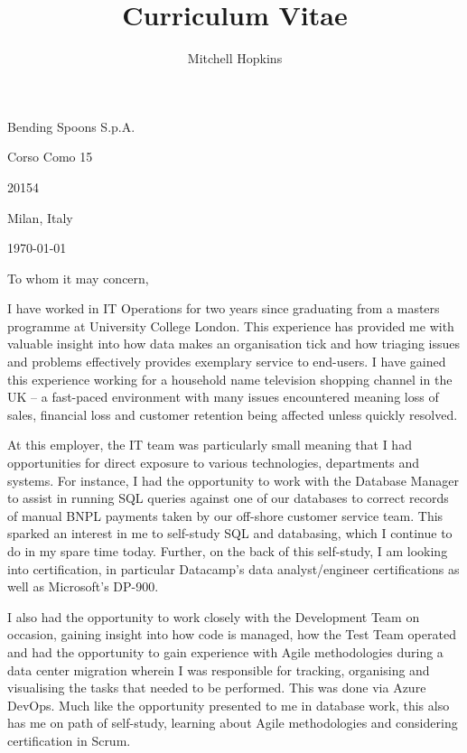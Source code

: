 \documentclass{article}
\begin{document}
\pagestyle{fancy}
\fancyhf{}
\title{Curriculum Vitae}
\author{Mitchell Hopkins}
\setlength\headheight{43pt}

\hspace*{0.5\linewidth}

\begin{minipage}{0.4\linewidth}
Bending Spoons S.p.A. \par
Corso Como 15 \par
20154 \par
Milan, Italy \par
\today
\end{minipage} \bigskip

To whom it may concern, \par \medskip

I have worked in IT Operations for two years since graduating from a masters programme at University College London. This experience has provided me with valuable insight into how data makes an organisation tick and how triaging issues and problems effectively provides exemplary service to end-users. I have gained this experience working for a household name television shopping channel in the UK -- a fast-paced environment with many issues encountered meaning loss of sales, financial loss and customer retention being affected unless quickly resolved.\medskip

At this employer, the IT team was particularly small meaning that I had opportunities for direct exposure to various technologies, departments and systems. For instance, I had the opportunity to work with the Database Manager to assist in running SQL queries against one of our databases to correct records of manual BNPL payments taken by our off-shore customer service team. This sparked an interest in me to self-study SQL and databasing, which I continue to do in my spare time today. Further, on the back of this self-study, I am looking into certification, in particular Datacamp's data analyst/engineer certifications as well as Microsoft's DP-900. \medskip

I also had the opportunity to work closely with the Development Team on occasion, gaining insight into how code is managed, how the Test Team operated and had the opportunity to gain experience with Agile methodologies during a data center migration wherein I was responsible for tracking, organising and visualising the tasks that needed to be performed. This was done via Azure DevOps. Much like the opportunity presented to me in database work, this also has me on path of self-study, learning about Agile methodologies and considering certification in Scrum. \medskip
\end{document}
